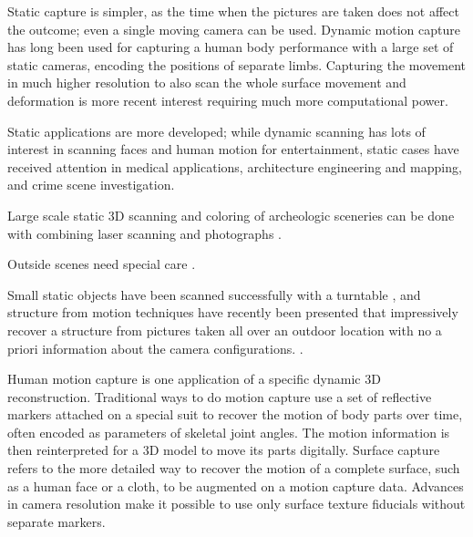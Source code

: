 Static capture is simpler, as the time when the pictures are taken does not affect the outcome; even a single moving camera can be used.
Dynamic motion capture has long been used for capturing a human body performance with a large set of static cameras, encoding the positions of separate limbs.
Capturing the movement in much higher resolution to also scan the whole surface movement and deformation is more recent interest requiring much more computational power.




Static applications are more developed;
while dynamic scanning has lots of interest in scanning faces and human motion for entertainment, static cases have received attention in medical applications, architecture engineering and mapping, and crime scene investigation.

Large scale static 3D scanning and coloring of archeologic sceneries can be done with combining laser scanning and photographs \cite{lerma2010terrestrial}.

Outside scenes need special care \cite{vu2012high}.

Small static objects have been scanned successfully with a turntable \cite{fitzgibbon1998automatic}, and structure from motion techniques have recently been presented that impressively recover a structure from pictures taken all over an outdoor location with no a priori information about the camera configurations. \cite{goesele2007multi,furukawa2010towards}.


Human motion capture is one application of a specific dynamic 3D reconstruction.
Traditional ways to do motion capture use a set of reflective markers attached on a special suit to recover the motion of body parts over time, often encoded as parameters of skeletal joint angles.
The motion information is then reinterpreted for a 3D model to move its parts digitally.
Surface capture refers to the more detailed way to recover the motion of a complete surface, such as a human face or a cloth, to be augmented on a motion capture data.
Advances in camera resolution make it possible to use only surface texture fiducials without separate markers.

